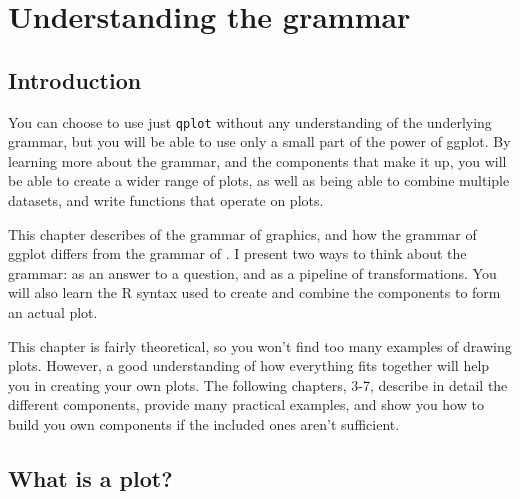 

\chapter{Understanding the grammar}

\section{Introduction}\label{sec:introduction}


You can choose to use just {\tt qplot} without any understanding of the underlying grammar, but you will be able to use only a small part of the power of ggplot.  By learning more about the grammar, and the components that make it up, you will be able to create a wider range of plots, as well as being able to combine multiple datasets, and write functions that operate on plots.  

This chapter describes of the grammar of graphics, and how the grammar of ggplot differs from the grammar of \citep{wilkinson:2006}.  I present two ways to think about the grammar: as an answer to a question, and as a pipeline of transformations.  You will also learn the R syntax used to create and combine the components to form an actual plot.  


This chapter is fairly theoretical, so you won't find too many examples of drawing plots.  However, a good understanding of how everything fits together will help you in creating your own plots.   The following chapters, 3-7, describe in detail the different components, provide many practical examples, and show you how to build you own components if the included ones aren't sufficient.  


\section{What is a plot?}\label{sec:what_is_a_plot}

